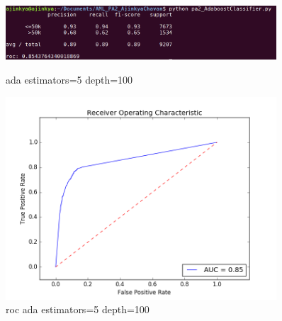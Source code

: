 \documentclass{article}
\begin{document}
\begin{figure}
    \centering
    \begin{minipage}{0.45\textwidth}
        \centering
        \includegraphics[width=0.9\textwidth]{ada_5_100.png} %
        \caption{ada estimators=5 depth=100}
    \end{minipage}\hfill
    \begin{minipage}{0.45\textwidth}
        \centering
        \includegraphics[width=0.9\textwidth]{roc_ada_5_100.png} %
        \caption{roc ada estimators=5 depth=100}
    \end{minipage}
\end{figure}
\end{document}
